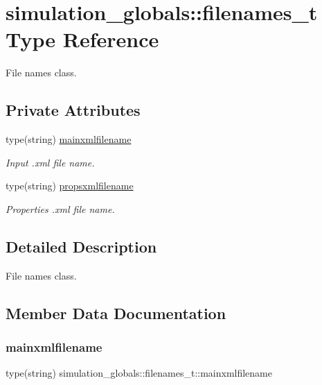 \hypertarget{structsimulation__globals_1_1filenames__t}{}\section{simulation\+\_\+globals\+:\+:filenames\+\_\+t Type Reference}
\label{structsimulation__globals_1_1filenames__t}


File names class.  


\subsection*{Private Attributes}
\begin{DoxyCompactItemize}
\item 
type(string) \hyperlink{structsimulation__globals_1_1filenames__t_aa869049343f7c4d46c36eb056bfd17a5}{mainxmlfilename}
\begin{DoxyCompactList}\small\item\em Input .xml file name. \end{DoxyCompactList}\item 
type(string) \hyperlink{structsimulation__globals_1_1filenames__t_a7574fc21683b726bc0cc9d41bf8f4513}{propsxmlfilename}
\begin{DoxyCompactList}\small\item\em Properties .xml file name. \end{DoxyCompactList}\end{DoxyCompactItemize}


\subsection{Detailed Description}
File names class. 

\subsection{Member Data Documentation}
\mbox{\label{structsimulation__globals_1_1filenames__t_aa869049343f7c4d46c36eb056bfd17a5}} 
\subsubsection{\texorpdfstring{mainxmlfilename}{mainxmlfilename}}
{\footnotesize\ttfamily type(string) simulation\+\_\+globals\+::filenames\+\_\+t\+::mainxmlfilename\hspace{0.3cm}{\ttfamily [private]}}



